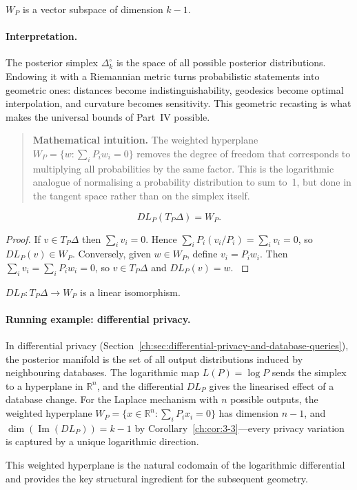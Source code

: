 \begin{proposition}
\label{ch:prop:3-1}
\(W_P\) is a vector subspace of dimension \(k-1\).
\end{proposition}

\paragraph{Interpretation.}
The posterior simplex $\Delta_k^\circ$ is the space of all possible posterior distributions.  Endowing it with a Riemannian metric turns probabilistic statements into geometric ones: distances become indistinguishability, geodesics become optimal interpolation, and curvature becomes sensitivity.  This geometric recasting is what makes the universal bounds of Part~IV possible.

\begin{quote}
\textbf{Mathematical intuition.}
The weighted hyperplane $W_P=\{w:\sum_i P_i w_i=0\}$ removes the degree of freedom that corresponds to multiplying all probabilities by the same factor.
This is the logarithmic analogue of normalising a probability distribution to sum to~1, but done in the tangent space rather than on the simplex itself.
\end{quote}

\begin{theorem}
\label{ch:thm:3-2}
\[ DL_P(T_P\Delta)=W_P. \]
\end{theorem}

\begin{proof}
If \(v\in T_P\Delta\) then \(\sum_i v_i=0\).  Hence
\(\sum_i P_i(v_i/P_i)=\sum_i v_i=0\), so \(DL_P(v)\in W_P\).
Conversely, given \(w\in W_P\), define \(v_i=P_iw_i\).  Then
\(\sum_i v_i=\sum_i P_iw_i=0\), so \(v\in T_P\Delta\) and
\(DL_P(v)=w\). \(\)
\end{proof}

\begin{corollary}
\label{ch:cor:3-3}
\(DL_P:T_P\Delta\to W_P\) is a linear isomorphism.
\end{corollary}

\paragraph{Running example: differential privacy.}
In differential privacy (Section~\ref{ch:sec:differential-privacy-and-database-queries}), the posterior manifold is the set of all output distributions induced by neighbouring databases.  The logarithmic map $L(P)=\log P$ sends the simplex to a hyperplane in $\mathbb R^n$, and the differential $DL_P$ gives the linearised effect of a database change.  For the Laplace mechanism with $n$ possible outputs, the weighted hyperplane $W_P=\{x\in\mathbb R^n:\sum_i P_i x_i=0\}$ has dimension $n-1$, and $\dim(\operatorname{Im}(DL_P))=k-1$ by Corollary~\ref{ch:cor:3-3}---every privacy variation is captured by a unique logarithmic direction.

This weighted hyperplane is the natural codomain of the logarithmic
differential and provides the key structural ingredient for the
subsequent geometry.
